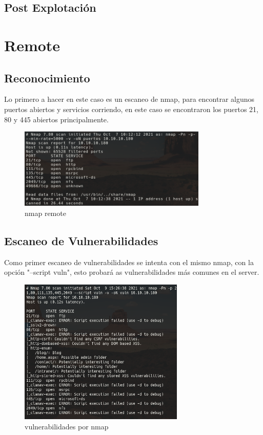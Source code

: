 \documentclass{article}
\begin{document}
\subsection{Post Explotación}

\clearpage
\section{Remote}
\subsection{Reconocimiento}
Lo primero a hacer en este caso es un escaneo de nmap, para encontrar algunos puertos abiertos y servicios corriendo, en este caso se encontraron los puertos 21, 80 y 445 abiertos principalmente.

\begin{figure}[h]
	\center
	\includegraphics[width=0.8\textwidth]{images/remote/nmap_remote.png}
	\caption{nmap remote}
\end{figure}
 
\subsection{Escaneo de Vulnerabilidades}

Como primer escaneo de vulnerabilidades se intenta con el mismo nmap, con la opción "--script vuln", esto probará as vulnerabilidades más comunes en el server.

\begin{figure}[h]
	\center
	\includegraphics[width=0.7\textwidth]{images/remote/nmap_vuln.png}
	\caption{vulnerabilidades por nmap}
\end{figure}
\end{document}
